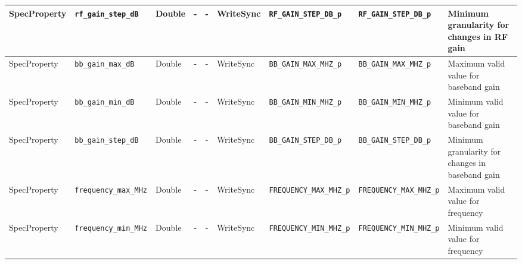 \begin{landscape}
\begin{scriptsize}
\begin{longtable}{|p{1.8cm}|p{4.1cm}|p{1cm}|c|c|p{1.6cm}|p{3.7cm}|p{3.7cm}|p{2.5cm}|}
			\hline
			SpecProperty & \verb+rf_gain_step_dB+              & Double& -        & -          & WriteSync      & \verb+RF_GAIN_STEP_DB_p+ & \verb+RF_GAIN_STEP_DB_p+ & Minimum granularity for changes in RF gain                                                                                                                                                                                  \\
			\hline
			SpecProperty & \verb+bb_gain_max_dB+               & Double& -        & -          & WriteSync      & \verb+BB_GAIN_MAX_MHZ_p+ & \verb+BB_GAIN_MAX_MHZ_p+ & Maximum valid value for baseband gain                                                                                                                                                                                       \\
			\hline
			SpecProperty & \verb+bb_gain_min_dB+               & Double& -        & -          & WriteSync      & \verb+BB_GAIN_MIN_MHZ_p+ & \verb+BB_GAIN_MIN_MHZ_p+ & Minimum valid value for baseband gain                                                                                                                                                                                       \\
			\hline
			SpecProperty & \verb+bb_gain_step_dB+              & Double& -        & -          & WriteSync      & \verb+BB_GAIN_STEP_DB_p+ & \verb+BB_GAIN_STEP_DB_p+ & Minimum granularity for changes in baseband gain                                                                                                                                                                            \\
			\hline
			SpecProperty & \verb+frequency_max_MHz+            & Double& -        & -          & WriteSync      & \verb+FREQUENCY_MAX_MHZ_p+ & \verb+FREQUENCY_MAX_MHZ_p+ & Maximum valid value for frequency                                                                                                                                                                                           \\
			\hline
			SpecProperty & \verb+frequency_min_MHz+            & Double& -        & -          & WriteSync      & \verb+FREQUENCY_MIN_MHZ_p+ & \verb+FREQUENCY_MIN_MHZ_p+ & Minimum valid value for frequency                                                                                                                                                                                           \\

\end{longtable}
\end{scriptsize}
\end{landscape}
